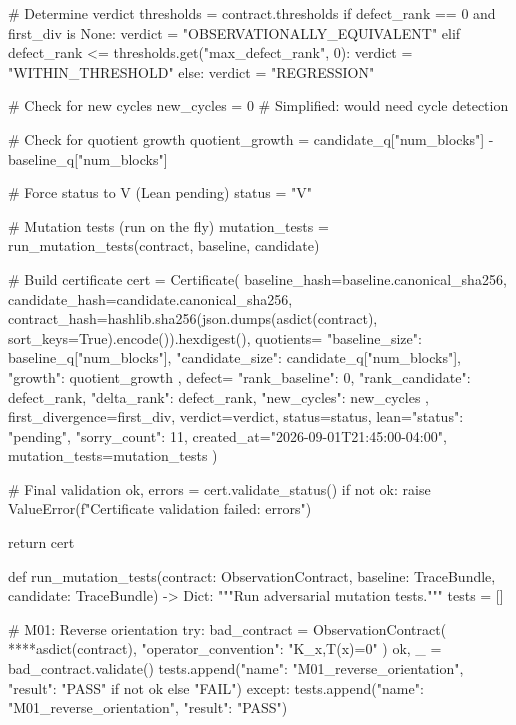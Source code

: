     # Determine verdict
    thresholds = contract.thresholds
    if defect_rank == 0 and first_div is None:
        verdict = "OBSERVATIONALLY_EQUIVALENT"
    elif defect_rank <= thresholds.get("max_defect_rank", 0):
        verdict = "WITHIN_THRESHOLD"
    else:
        verdict = "REGRESSION"
    
    # Check for new cycles
    new_cycles = 0  # Simplified: would need cycle detection
    
    # Check for quotient growth
    quotient_growth = candidate_q["num_blocks"] - baseline_q["num_blocks"]
    
    # Force status to V (Lean pending)
    status = "V"
    
    # Mutation tests (run on the fly)
    mutation_tests = run_mutation_tests(contract, baseline, candidate)
    
    # Build certificate
    cert = Certificate(
        baseline_hash=baseline.canonical_sha256,
        candidate_hash=candidate.canonical_sha256,
        contract_hash=hashlib.sha256(json.dumps(asdict(contract), sort_keys=True).encode()).hexdigest(),
        quotients={
            "baseline_size": baseline_q["num_blocks"],
            "candidate_size": candidate_q["num_blocks"],
            "growth": quotient_growth
        },
        defect={
            "rank_baseline": 0,
            "rank_candidate": defect_rank,
            "delta_rank": defect_rank,
            "new_cycles": new_cycles
        },
        first_divergence=first_div,
        verdict=verdict,
        status=status,
        lean={"status": "pending", "sorry_count": 11},
        created_at="2026-09-01T21:45:00-04:00",
        mutation_tests=mutation_tests
    )
    
    # Final validation
    ok, errors = cert.validate_status()
    if not ok:
        raise ValueError(f"Certificate validation failed: {errors}")
    
    return cert

def run_mutation_tests(contract: ObservationContract, baseline: TraceBundle, 
                       candidate: TraceBundle) -> Dict:
    """Run adversarial mutation tests."""
    tests = []
    
    # M01: Reverse orientation
    try:
        bad_contract = ObservationContract(
            **{**asdict(contract), "operator_convention": "K_x,T(x)=0"}
        )
        ok, _ = bad_contract.validate()
        tests.append({"name": "M01_reverse_orientation", "result": "PASS" if not ok else "FAIL"})
    except:
        tests.append({"name": "M01_reverse_orientation", "result": "PASS"})
    
